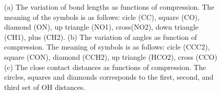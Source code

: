 \documentclass[prb,aps,nobibnotes,twocolumn,doublespace,twocolumngrid,superbib]{revtex4}
\begin{document}
\begin{figure}
\caption{(a) The variation of bond lengths as functions of compression.
The meaning of the symbols is as follows: cicle (CC), square (CO),
diamond (ON), up triangle (NO1), cross(NO2),
down triangle (CH1), plus (CH2). (b) The variation of angles as function of compression. The meaning of symbols is as follows:
cicle (CCC2), square (CON), diamond (CCH2), up triangle (HCO2), cross (CCO)
(c) The close contact distances as functions of compression. The circles, squares and diamonds corresponds to the first, second, and third set of OH distances.
}
\label{fig:intramolecular}
\end{figure}
\end{document}
